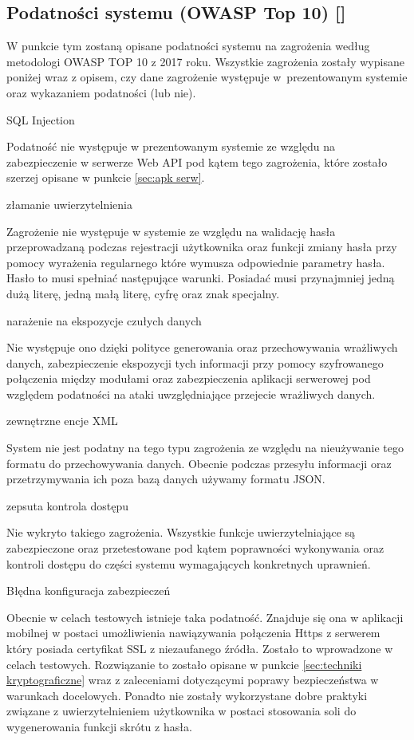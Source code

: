 \subsection{Podatności systemu (OWASP Top 10) [\StudentA]} \label{sec:OWASP}
W punkcie tym zostaną opisane podatności systemu na zagrożenia według metodologi OWASP TOP 10 z 2017 roku. Wszystkie zagrożenia zostały wypisane poniżej wraz z opisem, czy dane zagrożenie występuje w~prezentowanym systemie oraz wykazaniem podatności (lub nie).
\begin{enumerate*}
	\item SQL Injection 
	
	 Podatność nie występuje w prezentowanym systemie ze względu na zabezpieczenie w serwerze Web API pod kątem tego zagrożenia, które zostało szerzej opisane w punkcie \ref{sec:apk serw}.
	\item złamanie uwierzytelnienia 
	
	 Zagrożenie nie występuje w systemie ze względu na walidację hasła przeprowadzaną podczas rejestracji użytkownika oraz funkcji zmiany hasła przy pomocy wyrażenia regularnego które wymusza odpowiednie parametry hasła. Hasło to musi spełniać następujące warunki. Posiadać musi przynajmniej jedną dużą literę, jedną małą literę,  cyfrę oraz znak specjalny.
	\item narażenie na ekspozycje czułych danych 
	
	 Nie występuje ono dzięki polityce generowania oraz przechowywania wrażliwych danych,  zabezpieczenie ekspozycji tych informacji przy pomocy szyfrowanego połączenia między modułami oraz zabezpieczenia aplikacji serwerowej pod względem podatności na ataki uwzględniające przejecie wrażliwych danych.
	\item zewnętrzne encje XML 
	
	 System \NazwaSys \space nie jest podatny na tego typu zagrożenia ze względu na nieużywanie tego formatu do przechowywania danych. Obecnie podczas przesyłu informacji oraz przetrzymywania ich poza bazą danych używamy formatu JSON.
	\item zepsuta kontrola dostępu 
	
	 Nie wykryto takiego zagrożenia. Wszystkie funkcje uwierzytelniające są zabezpieczone oraz przetestowane pod kątem poprawności wykonywania oraz kontroli dostępu do części systemu wymagających konkretnych uprawnień.
	 \item Błędna konfiguracja zabezpieczeń
	 
	 Obecnie w celach testowych istnieje taka podatność. Znajduje się ona w aplikacji mobilnej w  postaci umożliwienia nawiązywania połączenia Https z serwerem który posiada certyfikat SSL z niezaufanego źródła. Zostało to wprowadzone w celach testowych. Rozwiązanie to zostało opisane w punkcie \ref{sec:techniki kryptograficzne} wraz z zaleceniami dotyczącymi poprawy bezpieczeństwa w warunkach docelowych. Ponadto nie zostały wykorzystane dobre praktyki związane z uwierzytelnieniem użytkownika w postaci stosowania soli do wygenerowania funkcji skrótu z hasła.
	 

\end{enumerate*}
